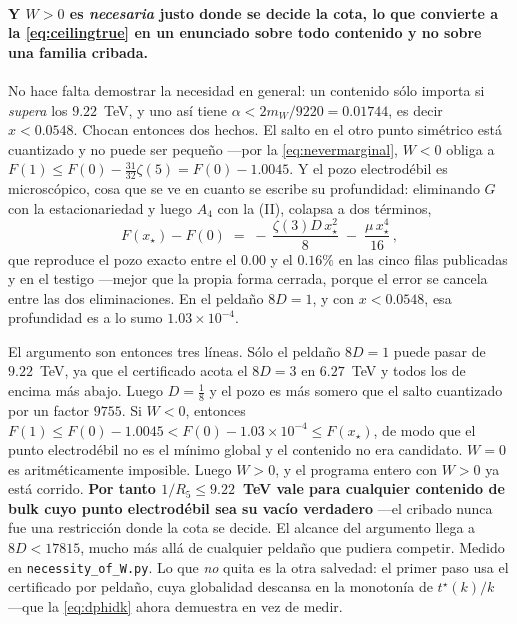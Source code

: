 \documentclass[11pt,a4paper]{article}
\begin{document}
\paragraph{Y $W>0$ es \emph{necesaria} justo donde se decide la cota, lo que convierte a la
\eqref{eq:ceilingtrue} en un enunciado sobre todo contenido y no sobre una familia cribada.} No hace
falta demostrar la necesidad en general: un contenido sólo importa si \emph{supera} los $9.22$~TeV, y
uno así tiene $\alpha<2m_W/9220=0.01744$, es decir $x<0.0548$. Chocan entonces dos hechos. El salto
en el otro punto simétrico está cuantizado y no puede ser pequeño ---por la
\eqref{eq:nevermarginal}, $W<0$ obliga a $F(1)\le F(0)-\tfrac{31}{32}\zeta(5)=F(0)-1.0045$. Y el
pozo electrodébil es microscópico, cosa que se ve en cuanto se escribe su profundidad: eliminando
$G$ con la estacionariedad y luego $A_4$ con la (II), colapsa a dos términos,
\begin{equation}\label{eq:depth}
  F(x_\star)-F(0)\;=\;-\,\frac{\zeta(3)D\,x_\star^{2}}{8}\;-\;\frac{\mu\,x_\star^{4}}{16}\,,
\end{equation}
que reproduce el pozo exacto entre el $0.00$ y el $0.16\%$ en las cinco filas publicadas y en el
testigo ---mejor que la propia forma cerrada, porque el error se cancela entre las dos
eliminaciones. En el peldaño $8D=1$, y con $x<0.0548$, esa profundidad es a lo sumo
$1.03\times10^{-4}$.

El argumento son entonces tres líneas. Sólo el peldaño $8D=1$ puede pasar de $9.22$~TeV, ya que el
certificado acota el $8D=3$ en $6.27$~TeV y todos los de encima más abajo. Luego $D=\tfrac18$ y el
pozo es más somero que el salto cuantizado por un factor $9755$. Si $W<0$, entonces
$F(1)\le F(0)-1.0045<F(0)-1.03\times10^{-4}\le F(x_\star)$, de modo que el punto electrodébil no es
el mínimo global y el contenido no era candidato. $W=0$ es aritméticamente imposible. Luego $W>0$, y
el programa entero con $W>0$ ya está corrido. \textbf{Por tanto $1/R_5\le9.22$~TeV vale para
cualquier contenido de bulk cuyo punto electrodébil sea su vacío verdadero} ---el cribado nunca fue
una restricción donde la cota se decide. El alcance del argumento llega a $8D<17815$, mucho más allá
de cualquier peldaño que pudiera competir. Medido en
\texttt{necessity\_\allowbreak of\_\allowbreak W.py}. Lo que \emph{no} quita es la otra salvedad:
el primer paso usa el certificado por
peldaño, cuya globalidad descansa en la monotonía de $t^\star(k)/k$ ---que la \eqref{eq:dphidk}
ahora demuestra en vez de medir.
\end{document}
